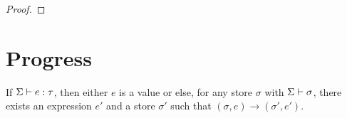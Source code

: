 \documentclass[a4paper, 11pt, article, danish, oneside]{memoir}
\newcommand{\step}{\to}
\begin{document}
\begin{proof}


\end{proof}


\section{Progress}

\begin{theorem}[Progress]
    If $\hastype{}{}{\Sigma}{e}{\tau}$, then either $e$ is a value or else, for any store $\sigma$ with $\stotype{}{}{\Sigma}{\sigma}$, there exists an expression $e'$ and a store $\sigma'$ such that $(\sigma,e) \step (\sigma',e')$.
\end{theorem}
\end{document}
